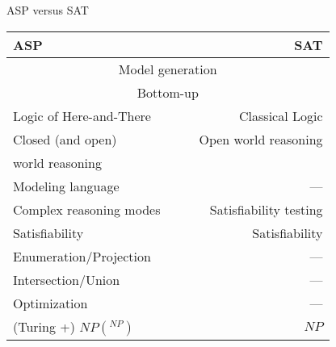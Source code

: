 \begin{frame}[c]{ASP versus SAT}
  \begin{center}\renewcommand{\arraystretch}{1.2}
    \begin{tabular}{lc|cr}
      \alert{ASP}                           &&& \alert{SAT}\\
      \hline\hline
      \multicolumn{4}{c}{Model generation}\\\hline
      \multicolumn{4}{c}{Bottom-up}\\\hline
      Logic of Here-and-There               &&& Classical Logic\\\hline
      Closed (and open)                     &&& Open world reasoning\\[-5pt]
      \qquad world reasoning                &&& \\\hline
      Modeling language                     &&&             ---\\\hline
      Complex reasoning modes               &&& Satisfiability testing\\
      \hspace*{12pt}Satisfiability          &&& Satisfiability\hspace*{12pt}\\[-3pt]
      \hspace*{12pt}Enumeration/Projection  &&& ---\hspace*{12pt}\\[-3pt]
      \hspace*{12pt}Intersection/Union      &&& ---\hspace*{12pt}\\[-3pt]
      \hspace*{12pt}Optimization            &&& ---\hspace*{12pt}\\\hline
      {\footnotesize (Turing +)} $\mathit{NP}(^\mathit{NP})$&&& $\mathit{NP}$
    \end{tabular}
  \end{center}
\end{frame}
%
